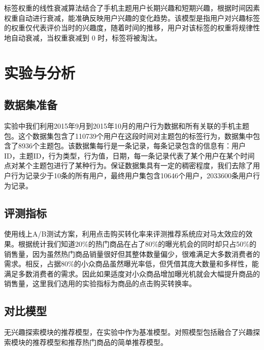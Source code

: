   标签权重的线性衰减算法结合了手机主题用户长期兴趣和短期兴趣，根据时间因素权重自动进行衰减，能准确反映用户兴趣的变化趋势。该模型是指用户对兴趣标签的权重仅代表评价当时的兴趣度，随着时间的推移，用户对该标签的权重将规律性地自动衰减，当权重衰减到 0 时，标签将被淘汰。


\section{实验与分析}
  \subsection{数据集准备}
  实验中我们利用2015年9月到2015年10月的用户行为数据和所有关联的手机主题包。这个数据集包含了110739个用户在这段时间对主题包的标签行为，数据集中包含了8936个主题包。该数据集每行是一条记录，每条记录包含的信息有：用户ID，主题ID，行为类型，行为值，日期，每一条记录代表了某个用户在某个时间点对某个主题包进行了某种行为。保证数据集具有一定的稠密程度，我们去除了用户行为记录少于10条的所有用户，最终用户集包含10646个用户，2033600条用户行为记录。
  \subsection{评测指标}
  使用线上A/B测试方案，利用点击购买转化率来评测推荐系统应对马太效应的效果。根据统计我们知道20\%的热门商品在占了80\%的曝光机会的同时却只占50\%的销售量，因为虽然热门商品销量很好但其整体数量偏少，很难满足大多数消费者的需求。相反，占据80\%的小众商品虽然曝光率低，但凭借其庞大数量和多样性，能满足多数消费者的需求。因此如果适度对小众商品增加曝光机就会大幅提升商品的销售量，这里我们选用的实验指标为商品的点击购买转换率。
  \subsection{对比模型}
  无兴趣探索模块的推荐模型，在实验中作为基准模型。对照模型包括融合了兴趣探索模块的推荐模型和推荐热门商品的简单推荐模型。
